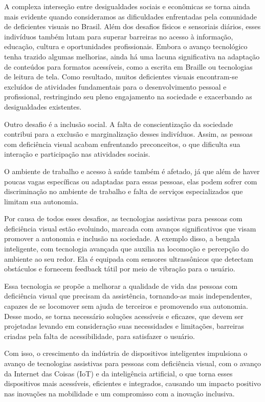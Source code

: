 A complexa interseção entre desigualdades sociais e econômicas se torna ainda mais evidente quando consideramos as dificuldades enfrentadas pela comunidade de deficientes visuais no Brasil. Além dos desafios físicos e sensoriais diários, esses indivíduos também lutam para superar barreiras no acesso à informação, educação, cultura e oportunidades profissionais. Embora o avanço tecnológico tenha trazido algumas melhorias, ainda há uma lacuna significativa na adaptação de conteúdos para formatos acessíveis, como a escrita em Braille ou tecnologias de leitura de tela. Como resultado, muitos deficientes visuais encontram-se excluídos de atividades fundamentais para o desenvolvimento pessoal e profissional, restringindo seu pleno engajamento na sociedade e exacerbando as desigualdades existentes.

Outro desafio é a inclusão social. A falta de conscientização da sociedade contribui para a exclusão e marginalização desses indivíduos. Assim, as pessoas com deficiência visual acabam enfrentando preconceitos, o que dificulta sua interação e participação nas atividades sociais.

O ambiente de trabalho e acesso à saúde também é afetado, já que além de haver poucas vagas específicas ou adaptadas para essas pessoas, elas podem sofrer com discriminação no ambiente de trabalho e falta de serviços especializados que limitam sua autonomia.

Por causa de todos esses desafios, as tecnologias assistivas para pessoas com deficiência visual estão evoluindo, marcada com avanços significativos que visam promover a autonomia e inclusão na sociedade. A exemplo disso, a bengala inteligente, com tecnologia avançada que auxilia na locomoção e percepção do ambiente ao seu redor.  Ela é equipada com sensores ultrassônicos que detectam obstáculos e fornecem feedback tátil por meio de vibração para o usuário.

Essa tecnologia se propõe a melhorar a qualidade de vida das pessoas com deficiência visual que precisam da assistência, tornando-as mais independentes, capazes de se locomover sem ajuda de terceiros e promovendo sua autonomia. Desse modo, se torna necessário soluções acessíveis e eficazes, que devem ser projetadas levando em consideração suas necessidades e limitações, barreiras criadas pela falta de acessibilidade, para satisfazer o usuário.

Com isso, o crescimento da indústria de dispositivos inteligentes impulsiona o avanço de tecnologias assistivas para pessoas com deficiência visual, com o avanço da Internet das Coisas (IoT) e da inteligência artificial, o que torna esses dispositivos mais acessíveis, eficientes e integrados, causando um impacto positivo nas inovações na mobilidade e um compromisso com a inovação inclusiva.

